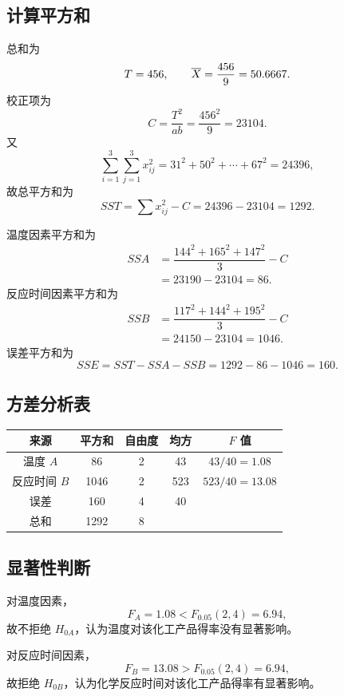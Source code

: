 \documentclass{article}
\newcommand{\barline}[1]{\overline{#1\rule{0pt}{1.5ex}}}
\begin{document}
\subsection{计算平方和}

总和为
\[
    T=456,\qquad \barline{X}=\dfrac{456}{9}=50.6667.
\]
校正项为
\[
    C=\dfrac{T^2}{ab}=\dfrac{456^2}{9}=23104.
\]
又
\[
    \sum_{i=1}^{3}\sum_{j=1}^{3}x_{ij}^{2}
    =31^2+50^2+\cdots+67^2=24396,
\]
故总平方和为
\[
    SST=\sum x_{ij}^{2}-C=24396-23104=1292.
\]

温度因素平方和为
\[
\begin{aligned}
    SSA&=\dfrac{144^2+165^2+147^2}{3}-C\\
       &=23190-23104=86.
\end{aligned}
\]
反应时间因素平方和为
\[
\begin{aligned}
    SSB&=\dfrac{117^2+144^2+195^2}{3}-C\\
       &=24150-23104=1046.
\end{aligned}
\]
误差平方和为
\[
    SSE=SST-SSA-SSB=1292-86-1046=160.
\]

\subsection{方差分析表}

\begin{center}
    \setlength{\tabcolsep}{14pt}
    \renewcommand{\arraystretch}{1.25}
    \begin{tabular}{|c|c|c|c|c|}
        \hline
        来源 & 平方和 & 自由度 & 均方 & $F$ 值 \\
        \hline
        温度 $A$ & 86 & 2 & 43 & $43/40=1.08$ \\
        \hline
        反应时间 $B$ & 1046 & 2 & 523 & $523/40=13.08$ \\
        \hline
        误差 & 160 & 4 & 40 &  \\
        \hline
        总和 & 1292 & 8 &  &  \\
        \hline
    \end{tabular}
\end{center}

\subsection{显著性判断}

对温度因素，
\[
    F_A=1.08<F_{0.05}(2,4)=6.94,
\]
故不拒绝 $H_{0A}$，认为温度对该化工产品得率没有显著影响。

对反应时间因素，
\[
    F_B=13.08>F_{0.05}(2,4)=6.94,
\]
故拒绝 $H_{0B}$，认为化学反应时间对该化工产品得率有显著影响。
\end{document}
